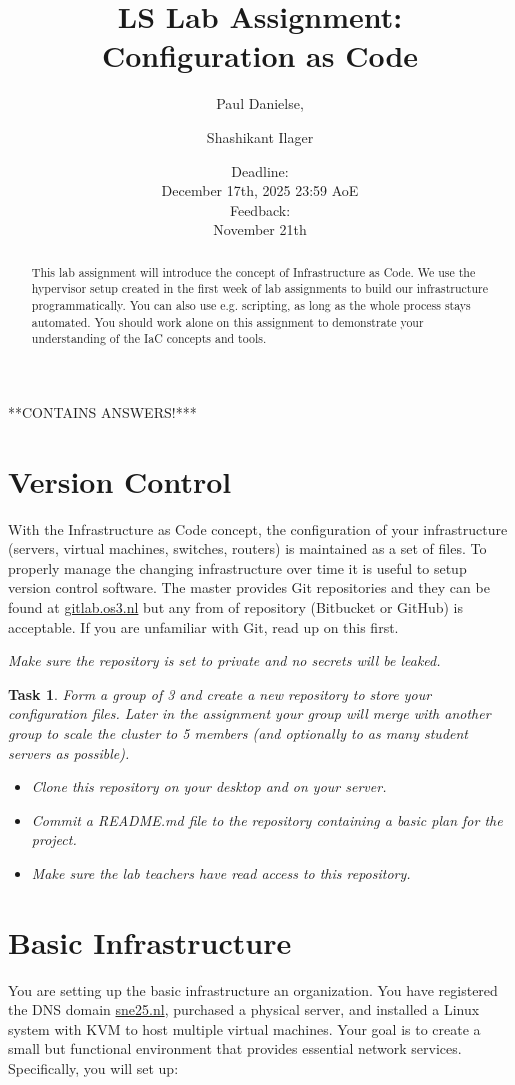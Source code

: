 \documentclass[11pt,a4paper]{exam}
\title{LS Lab Assignment:\\
Configuration as Code }
\author{Paul Danielse, \and{Shashikant Ilager}}
\date{ Deadline: \\ December 17th, 2025 23:59 AoE \\ Feedback: \\ November 21th}
\newtheorem{task}{Task}
\begin{document}
\ifprintanswers
{\Huge ***CONTAINS ANSWERS!***}
\fi
\maketitle


\begin{abstract}
This lab assignment will introduce the concept of Infrastructure as Code.
We use the hypervisor setup created in the first week of lab assignments to build our infrastructure programmatically. You can also use e.g. scripting, as long as the whole process stays automated. You should work alone on this assignment to demonstrate your understanding of the IaC concepts and tools.
\end{abstract}
%
\section*{Version Control}
With the Infrastructure as Code concept, the configuration of your infrastructure (servers, virtual machines, switches, routers) is maintained as a set of files. To properly manage the changing infrastructure over time it is useful to setup version control software. The master provides Git repositories and they can be found at \url{gitlab.os3.nl} but any from of repository (Bitbucket or GitHub) is acceptable. If you are unfamiliar with Git, read up on this first.

\vspace{.2cm} \noindent \textit{Make sure the repository is set to private and no secrets will be leaked.}

\begin{task}
Form a group of 3 and create a new repository to store your configuration files. Later in the assignment your group will merge with another group to scale the cluster to 5 members (and optionally to as many student servers as possible).
\begin{itemize}
    \item Clone this repository on your desktop and on your server.
    \item Commit a README.md file to the repository containing a basic plan for the project.
    \item Make sure the lab teachers have read access to this repository.
\end{itemize}
\end{task}

\section*{Basic Infrastructure}
You are setting up the basic infrastructure an organization. You have registered
the DNS domain \url{sne25.nl}, purchased a physical server, and installed a Linux system with KVM to host multiple virtual machines. Your goal is to create a small but functional environment that provides essential network services. Specifically, you will set up:
\end{document}

